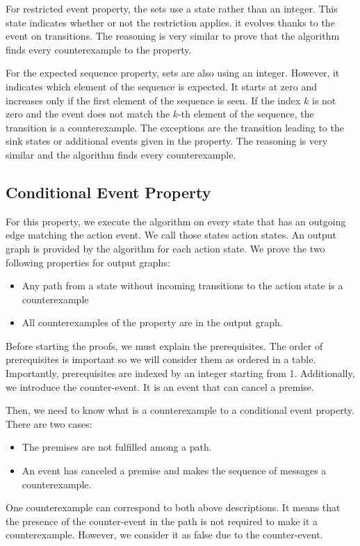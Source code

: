 For restricted event property, the sets use a state rather than an integer.
This state indicates whether or not the restriction applies. 
it evolves thanks to the event on transitions.
The reasoning is very similar to prove that the algorithm finds every counterexample to the property.

For the expected sequence property, sets are also using an integer. 
However, it indicates which element of the sequence is expected.
It starts at zero and increases only if the first element of the sequence is seen.
If the index $k$ is not zero and the event does not match the $k$-th element of the sequence, the transition is a counterexample.
The exceptions are the transition leading to the sink states or additional events given in the property.
The reasoning is very similar and the algorithm finds every counterexample.



\subsection{Conditional Event Property}
For this property, we execute the algorithm on every state that has an outgoing edge matching the action event.
We call those states action states.
An output graph is provided by the algorithm for each action state.
We prove the two following properties for output graphs:
\begin{itemize}
    \item Any path from a state without incoming transitions to the action state is a counterexample
    \item All counterexamples of the property are in the output graph. 
\end{itemize}
Before starting the proofs, we must explain the prerequisites.
The order of prerequisites is important so we will consider them as ordered in a table.
Importantly, prerequisites are indexed by an integer starting from 1.
Additionally, we introduce the counter-event.
It is an event that can cancel a premise.  

Then, we need to know what is a counterexample to a conditional event property.
There are two cases:
\begin{itemize}
    \item The premises are not fulfilled among a path.
    \item An event has canceled a premise and makes the sequence of messages a counterexample.
\end{itemize}
One counterexample can correspond to both above descriptions.
It means that the presence of the counter-event in the path is not required to make it a counterexample.
However, we consider it as false due to the counter-event.

